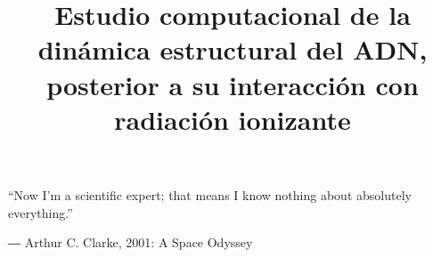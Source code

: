 \documentclass[a4paper, twoside, 12pt]{article}
\title{Estudio computacional de la dinámica estructural del
ADN, posterior a su interacción con radiación ionizante}
\begin{document}


\epigraph{“Now I'm a scientific expert; that means I know nothing about absolutely everything.”}
{― Arthur C. Clarke, 2001: A Space Odyssey}







\clearpage
{}
\small{\tableofcontents}
\clearpage
\small{
\listoffigures}

\clearpage




%













%





\appendix
\renewcommand*{\thesection}{\Alph{section}}\textbf{}








\clearpage
\renewcommand*{\thesection}{}\textbf{}

%
%


\end{document}
